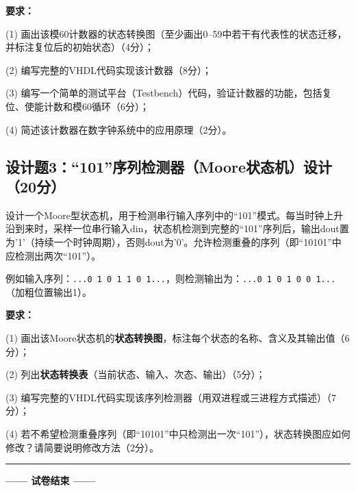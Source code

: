 \vspace{0.3cm}

\textbf{要求：}

(1) 画出该模60计数器的状态转换图（至少画出0--59中若干有代表性的状态迁移，并标注复位后的初始状态）（4分）；

(2) 编写完整的VHDL代码实现该计数器（8分）；

(3) 编写一个简单的测试平台（Testbench）代码，验证计数器的功能，包括复位、使能计数和模60循环（6分）；

(4) 简述该计数器在数字钟系统中的应用原理（2分）。

\vspace{0.5cm}

\subsection{设计题3：``101''序列检测器（Moore状态机）设计（20分）}

设计一个Moore型状态机，用于检测串行输入序列中的``101''模式。每当时钟上升沿到来时，采样一位串行输入din，状态机检测到完整的``101''序列后，输出dout置为'1'（持续一个时钟周期），否则dout为'0'。允许检测重叠的序列（即``10101''中应检测出两次``101''）。

\vspace{0.3cm}

例如输入序列：\verb|...0 1 0 1 1 0 1...|，则检测输出为：\verb|...0 1 0 1 0 0 1...|（加粗位置输出1）。

\vspace{0.3cm}

\textbf{要求：}

(1) 画出该Moore状态机的\textbf{状态转换图}，标注每个状态的名称、含义及其输出值（6分）；

(2) 列出\textbf{状态转换表}（当前状态、输入、次态、输出）（5分）；

(3) 编写完整的VHDL代码实现该序列检测器（用双进程或三进程方式描述）（7分）；

(4) 若不希望检测重叠序列（即``10101''中只检测出一次``101''），状态转换图应如何修改？请简要说明修改方法（2分）。

\vspace{0.3cm}

{\centering
\rule{0.8\textwidth}{0.5pt}
\vspace{0.3cm}

\textbf{—— 试卷结束 ——}

\vspace{0.5cm}}

\endinput
